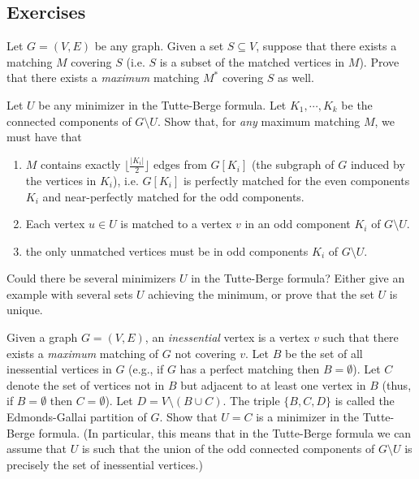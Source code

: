 \documentclass[12pt]{article}
\begin{document}
\subsection*{Exercises}
\begin{exercises}
\item
Let $G=(V,E)$ be any graph. Given a set
$S\subseteq V$, suppose that there exists a matching $M$ covering $S$
(i.e. $S$ is a subset of the matched vertices in $M$). Prove that
there exists a {\it maximum} matching $M^*$ covering $S$ as well. 

\item \label{ex2-3}
Let $U$ be any minimizer in the Tutte-Berge formula. Let $K_1,
  \cdots, K_k$ be the connected components of $G\setminus U$.  Show
  that, for {\it any} maximum matching $M$, we must have that
\begin{enumerate}
\item
$M$ contains exactly $\lfloor \frac{|K_i|}{2}\rfloor$ edges from
$G[K_i]$ (the subgraph of $G$ induced by the vertices in
$K_i$), i.e. $G[K_i]$ is perfectly matched for the even components $K_i$ and
near-perfectly matched for the odd components. 
\item
Each vertex $u\in U$ is matched to a vertex $v$ in an odd component
$K_i$ of $G\setminus U$.
\item
the only unmatched vertices must be in odd components $K_i$ of
$G\setminus U$.  
\end{enumerate}  

\item
Could there be several minimizers $U$ in the Tutte-Berge formula?
Either give an example with several sets $U$ achieving the minimum, or
prove that the set $U$ is unique.  

\item %
Given a graph $G=(V,E)$, an {\it inessential} vertex is a vertex $v$
such that there exists a {\it maximum} matching of $G$ not covering
$v$. Let $B$ be the set of all inessential vertices in $G$ (e.g., if
$G$ has a perfect matching then $B=\emptyset$). Let $C$ denote the set
of vertices not in $B$ but adjacent to at least one vertex in $B$
(thus, if $B=\emptyset$ then $C=\emptyset$). Let $D=V\setminus (B\cup
C)$. The triple $\{B, C, D\}$ is called the Edmonds-Gallai partition
of $G$. Show that $U=C$ is a minimizer in the Tutte-Berge formula. (In
particular, this means that in the Tutte-Berge formula we can assume
that $U$ is such that the union of the odd connected components of
$G\setminus U$ is precisely the set of inessential vertices.)




\end{exercises}
\end{document}
